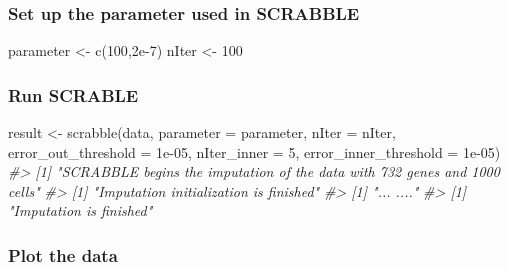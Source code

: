 \documentclass[]{article}
\newcommand{\hlnum}[1]{\textcolor[rgb]{0.816,0.125,0.439}{#1}}%
\newcommand{\hlstr}[1]{\textcolor[rgb]{0.251,0.627,0.251}{#1}}%
\newcommand{\hlcom}[1]{\textcolor[rgb]{0.502,0.502,0.502}{\textit{#1}}}%
\newcommand{\hlstd}[1]{\textcolor[rgb]{0.251,0.251,0.251}{#1}}%
\newcommand{\hlkwc}[1]{\textcolor[rgb]{0.251,0.251,0.251}{#1}}%
\newcommand{\hlkwd}[1]{\textcolor[rgb]{0.878,0.439,0.125}{#1}}%
\newenvironment{Shaded}{\begin{myshaded}}{\end{myshaded}}
\newcommand{\KeywordTok}[1]{\hlkwd{#1}}
\newcommand{\DataTypeTok}[1]{\hlkwc{#1}}
\newcommand{\DecValTok}[1]{\hlnum{#1}}
\newcommand{\FloatTok}[1]{\hlnum{#1}}
\newcommand{\StringTok}[1]{\hlstr{#1}}
\newcommand{\CommentTok}[1]{\hlcom{#1}}
\newcommand{\NormalTok}[1]{\hlstd{#1}}
\begin{document}
\subsubsection{Set up the parameter used in
SCRABBLE}\label{set-up-the-parameter-used-in-scrabble}

\begin{Shaded}
\begin{Highlighting}[]
\NormalTok{parameter <-}\StringTok{ }\KeywordTok{c}\NormalTok{(}\DecValTok{100}\NormalTok{,}\FloatTok{2e-7}\NormalTok{)}
\NormalTok{nIter <-}\StringTok{ }\DecValTok{100}
\end{Highlighting}
\end{Shaded}

\subsubsection{Run SCRABLE}\label{run-scrable}

\begin{Shaded}
\begin{Highlighting}[]
\NormalTok{result <-}\StringTok{ }\KeywordTok{scrabble}\NormalTok{(data, }\DataTypeTok{parameter =}\NormalTok{ parameter, }\DataTypeTok{nIter =}\NormalTok{ nIter, }\DataTypeTok{error_out_threshold =} \FloatTok{1e-05}\NormalTok{, }\DataTypeTok{nIter_inner =} \DecValTok{5}\NormalTok{, }\DataTypeTok{error_inner_threshold =} \FloatTok{1e-05}\NormalTok{)}
\CommentTok{#> [1] "SCRABBLE begins the imputation of the data with 732 genes and 1000 cells"}
\CommentTok{#> [1] "Imputation initialization is finished"}
\CommentTok{#> [1] "... ...."}
\CommentTok{#> [1] "Imputation is finished"}
\end{Highlighting}
\end{Shaded}

\subsubsection{Plot the data}\label{plot-the-data-1}
\end{document}
